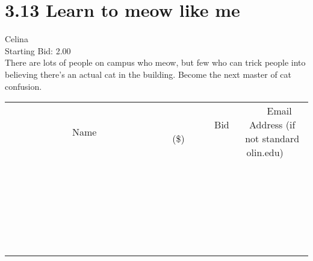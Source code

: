 \documentclass[11pt]{article}
\begin{document}
					\section*{3.13 Learn to meow like me}
					Celina \\
					Starting Bid: 2.00 \\
					There are lots of people on campus who meow, but few who can trick people into believing there's an actual cat in the building. Become the next master of cat confusion. \\
					[6ex]
					\begin{tabular}{c c c}
						~~~~~~~~~~~~~Name~~~~~~~~~~~~~ & ~~~~~~~~~Bid (\$)~~~~~~~~~ & ~~~Email Address (if not standard olin.edu)~~~ \\
				
 & & \\
\hline
 & & \\
\hline
 & & \\
\hline
 & & \\
\hline
 & & \\
\hline
 & & \\
\hline
 & & \\
\hline
 & & \\
\hline
 & & \\
\hline
 & & \\
\hline
 & & \\
\hline
 & & \\
\hline
 & & \\
\hline
 & & \\
\hline
 & & \\
\hline
 & & \\
\hline
 & & \\
\hline
 & & \\
\hline
 & & \\
\hline
 & & \\
\hline
 & & \\
\hline
 & & \\
\hline
 & & \\
\hline
 & & \\
\hline
 & & \\
\hline
 & & \\
\hline
					\end{tabular}
					\clearpage
				
\end{document}
